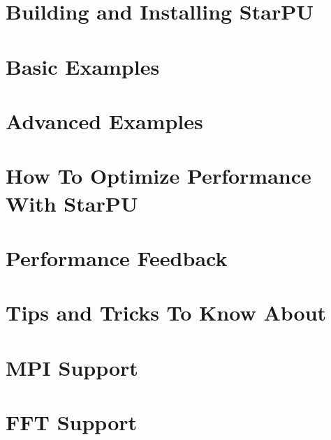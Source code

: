 \documentclass{book}
\begin{document}
\chapter{Building and Installing StarPU}
\label{BuildingAndInstallingStarPU}
\hypertarget{BuildingAndInstallingStarPU}{}


\chapter{Basic Examples}
\label{BasicExamples}
\hypertarget{BasicExamples}{}


\chapter{Advanced Examples}
\label{AdvancedExamples}
\hypertarget{AdvancedExamples}{}


\chapter{How To Optimize Performance With StarPU}
\label{HowToOptimizePerformanceWithStarPU}
\hypertarget{HowToOptimizePerformanceWithStarPU}{}


\chapter{Performance Feedback}
\label{PerformanceFeedback}
\hypertarget{PerformanceFeedback}{}


\chapter{Tips and Tricks To Know About}
\label{TipsAndTricksToKnowAbout}
\hypertarget{TipsAndTricksToKnowAbout}{}


\chapter{MPI Support}
\label{MPISupport}
\hypertarget{MPISupport}{}


\chapter{FFT Support}
\label{FFTSupport}
\hypertarget{FFTSupport}{}

\end{document}
